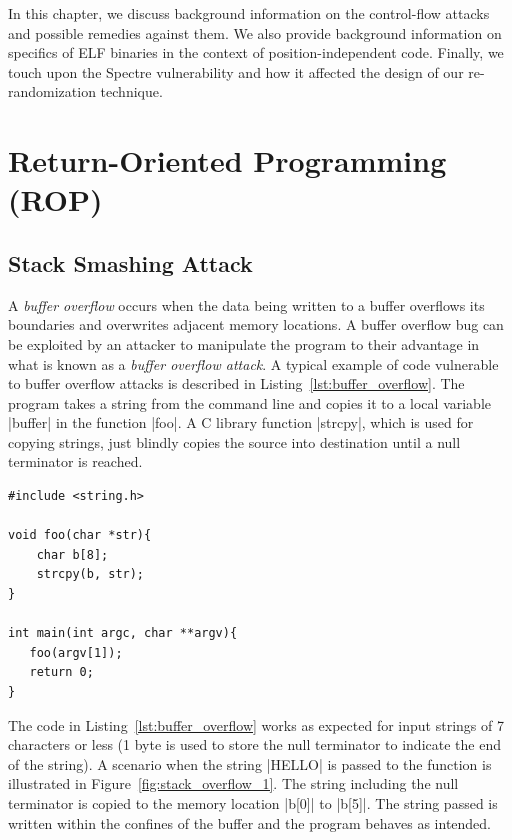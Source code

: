 In this chapter, we discuss background information on the control-flow attacks and possible remedies against them. We also provide background information on specifics of ELF binaries in the context of position-independent code. Finally, we touch upon the Spectre vulnerability and how it affected the design of our re-randomization technique.


\section{Return-Oriented Programming (ROP)}
\label{sec:bg_rop}
\subsection{Stack Smashing Attack}

A \textit{buffer overflow} occurs when the data being written to a buffer overflows its boundaries and overwrites adjacent memory locations. A buffer overflow bug can be exploited by an attacker to manipulate the program to their advantage in what is known as a \textit{buffer overflow attack}.
A typical example of code vulnerable to buffer overflow attacks is described in Listing~\ref{lst:buffer_overflow}. The program takes a string from the command line and copies it to a local variable |buffer| in the function |foo|. A C library function |strcpy|, which is used for copying strings, just blindly copies the source into destination until a null terminator is reached.

\lstset{language=C}
\begin{lstlisting}[frame=single, caption={Buffer Overflow Example Code},label={lst:buffer_overflow}]
#include <string.h>

void foo(char *str){
    char b[8];
    strcpy(b, str);
}

int main(int argc, char **argv){
   foo(argv[1]);
   return 0;
}
\end{lstlisting}

The code in Listing~\ref{lst:buffer_overflow} works as expected for input strings of 7 characters or less (1 byte is used to store the null terminator to indicate the end of the string). A scenario when the string |HELLO| is passed to the function is illustrated in Figure~\ref{fig:stack_overflow_1}. The string including the null terminator is copied to the memory location |b[0]| to |b[5]|. The string passed is written within the confines of the buffer and the program behaves as intended.

